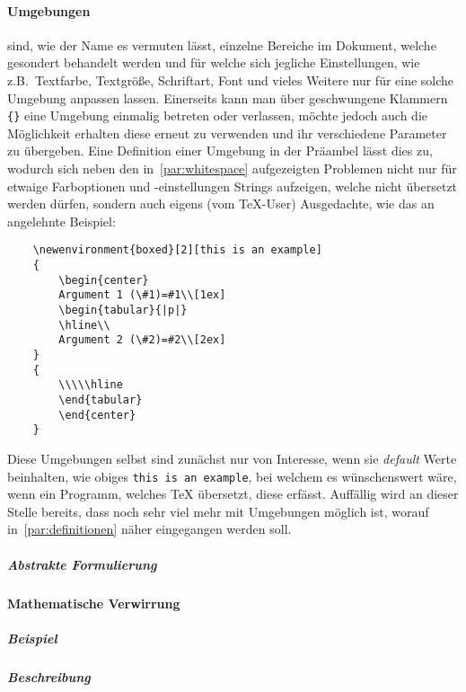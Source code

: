 \paragraph*{Umgebungen} sind, wie der Name es vermuten lässt, einzelne Bereiche im Dokument, welche gesondert behandelt werden und für welche sich jegliche Einstellungen, wie z.B.\ Textfarbe, Textgröße, Schriftart, Font und vieles Weitere nur für eine solche Umgebung anpassen lassen. Einerseits kann man über geschwungene Klammern \verb|{}| eine Umgebung einmalig betreten oder verlassen, möchte jedoch auch die Möglichkeit erhalten diese erneut zu verwenden und ihr verschiedene Parameter zu übergeben. Eine Definition einer Umgebung in der Präambel lässt dies zu, %
wodurch sich neben den in~\ref{par:whitespace} aufgezeigten Problemen nicht nur für etwaige Farboptionen und -einstellungen Strings aufzeigen, welche nicht übersetzt werden dürfen, sondern auch eigens (vom \TeX{}-User) Ausgedachte, wie das an \citep{latex:overleaf:environments} angelehnte Beispiel:
\begin{Verbatim}
    \newenvironment{boxed}[2][this is an example]
    {
        \begin{center}
        Argument 1 (\#1)=#1\\[1ex]
        \begin{tabular}{|p|}
        \hline\\
        Argument 2 (\#2)=#2\\[2ex]
    }
    { 
        \\\\\hline
        \end{tabular} 
        \end{center}
    }
\end{Verbatim}
Diese Umgebungen selbst sind zunächst nur von Interesse, wenn sie \textit{default} Werte beinhalten, wie obiges \texttt{this is an example}, bei welchem es wünschenswert wäre, wenn ein Programm, welches \TeX{} übersetzt, diese erfässt. Auffällig wird an dieser Stelle bereits, dass noch sehr viel mehr mit Umgebungen möglich ist, worauf in~\ref{par:definitionen} näher eingegangen werden soll.

\subparagraph*{Abstrakte Formulierung}







\paragraph*{Mathematische Verwirrung}%
\subparagraph*{Beispiel}
\subparagraph*{Beschreibung}

